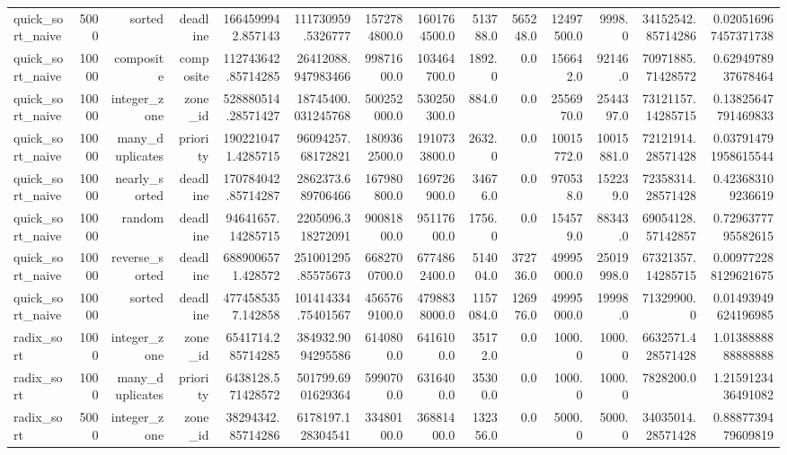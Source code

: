 \begin{table}[htbp]
\begin{tabular}{lrrrrrrrrrrrrr}
quick_sort_naive & 5000 & sorted & deadline & 1664599942.857143 & 111730959.5326777 & 1572784800.0 & 1601764500.0 & 513788.0 & 565248.0 & 12497500.0 & 9998.0 & 34152542.85714286 & 0.020516967457371738 \\
quick_sort_naive & 10000 & composite & composite & 112743642.85714285 & 26412088.947983466 & 99871600.0 & 103464700.0 & 1892.0 & 0.0 & 156642.0 & 92146.0 & 70971885.71428572 & 0.6294978937678464 \\
quick_sort_naive & 10000 & integer_zone & zone_id & 528880514.28571427 & 18745400.031245768 & 500252000.0 & 530250300.0 & 884.0 & 0.0 & 2556970.0 & 2544397.0 & 73121157.14285715 & 0.13825647791469833 \\
quick_sort_naive & 10000 & many_duplicates & priority & 1902210471.4285715 & 96094257.68172821 & 1809362500.0 & 1910733800.0 & 2632.0 & 0.0 & 10015772.0 & 10015881.0 & 72121914.28571428 & 0.037914791958615544 \\
quick_sort_naive & 10000 & nearly_sorted & deadline & 170784042.85714287 & 2862373.689706466 & 167980800.0 & 169726900.0 & 34676.0 & 0.0 & 970538.0 & 152239.0 & 72358314.28571428 & 0.423683109236619 \\
quick_sort_naive & 10000 & random & deadline & 94641657.14285715 & 2205096.318272091 & 90081800.0 & 95117600.0 & 1756.0 & 0.0 & 154579.0 & 88343.0 & 69054128.57142857 & 0.7296377795582615 \\
quick_sort_naive & 10000 & reverse_sorted & deadline & 6889006571.428572 & 251001295.85575673 & 6682700700.0 & 6774862400.0 & 514004.0 & 372736.0 & 49995000.0 & 25019998.0 & 67321357.14285715 & 0.009772288129621675 \\
quick_sort_naive & 10000 & sorted & deadline & 4774585357.142858 & 101414334.75401567 & 4565769100.0 & 4798838000.0 & 1157084.0 & 126976.0 & 49995000.0 & 19998.0 & 71329900.0 & 0.01493949624196985 \\
radix_sort & 1000 & integer_zone & zone_id & 6541714.285714285 & 384932.9094295586 & 6140800.0 & 6416100.0 & 35172.0 & 0.0 & 1000.0 & 1000.0 & 6632571.428571428 & 1.0138888888888888 \\
radix_sort & 1000 & many_duplicates & priority & 6438128.571428572 & 501799.6901629364 & 5990700.0 & 6316400.0 & 35300.0 & 0.0 & 1000.0 & 1000.0 & 7828200.0 & 1.2159123436491082 \\
radix_sort & 5000 & integer_zone & zone_id & 38294342.85714286 & 6178197.128304541 & 33480100.0 & 36881400.0 & 132356.0 & 0.0 & 5000.0 & 5000.0 & 34035014.28571428 & 0.8887739479609819 \\

\end{tabular}
\end{table}
